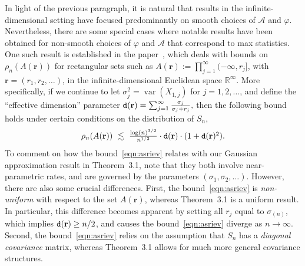 \documentclass[aos,preprint]{imsart}
\numberwithin{equation}{section}
\theoremstyle{plain}
\newcommand{\R}{\mathbb{R}}
\newcommand{\var}{\operatorname{var}}
\newcommand{\ts}{\textstyle}
\newcommand{\1}{{\bf{1}}}
\newcommand{\0}{\mathbf{0}}
\begin{document}
   
   In light of the previous paragraph, it is natural that results in the infinite-dimensional setting have focused predominantly on smooth choices of $\mathscr{A}$ and $\varphi$. Nevertheless, there are some special cases where notable results have been obtained for non-smooth choices of $\varphi$ and $\mathscr{A}$ that correspond to max statistics. One such result is established in the paper~\citep{Asriev:1986}, which deals with bounds on $\rho_n(A(\mathbf{r}))$ for rectangular sets such as $A(\mathbf{r}):= \prod_{j=1}^{\infty}(-\infty,r_j]$,  with $\mathbf{r}=(r_1,r_2,\dots)$, in the infinite-dimensional Euclidean space $\R^{\infty}$. More specifically, if we continue to let $\sigma_j^2=\var(X_{1,j})$ for $j=1,2,\dots$, and define the ``effective dimension'' parameter
   $ {\tt{d}}(\mathbf{r})=\sum_{j=1}^{\infty} \ts\frac{\sigma_j}{\sigma_j+r_j},$
   then the following bound holds under certain conditions on the distribution of $S_n$,
   \begin{equation}\label{eqn:asriev}
    \rho_n(A(\mathbf{r})) \ \lesssim \  \ts\frac{\log(n)^{3/2}}{n^{1/2}} \cdot {\tt{d}}(\mathbf{r})\cdot(1+\tt{d}(\mathbf{r})^2).
   \end{equation}
To comment on how the bound~\eqref{eqn:asriev} relates with our Gaussian approximation result in Theorem~3.1, note that they both involve near-parametric rates, and are governed by the parameters $(\sigma_1,\sigma_2,\dots)$. However, there are also some crucial differences. First, the bound~\eqref{eqn:asriev} is \emph{non-uniform} with respect to the set $A(\mathbf{r})$, whereas Theorem~3.1 is a uniform result. In particular, this difference becomes apparent by setting all $r_j$ equal to $\sigma_{(n)}$, which implies ${\tt{d}}(\mathbf{r})\geq n/2$, and causes the bound~\eqref{eqn:asriev} diverge as $n\to\infty$.  Second, the bound~\eqref{eqn:asriev} relies on the assumption that $S_n$ has a \emph{diagonal covariance} matrix, whereas Theorem~3.1 allows for much more general covariance structures.
\end{document}
